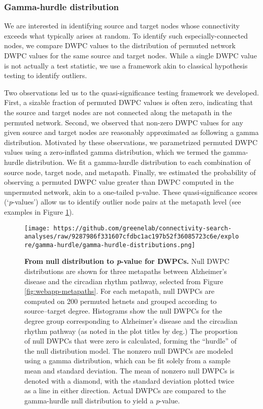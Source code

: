 \hypertarget{gamma-hurdle-distribution}{%
\subsubsection{Gamma-hurdle distribution}\label{gamma-hurdle-distribution}}

We are interested in identifying source and target nodes whose connectivity exceeds what typically arises at random.
To identify such especially-connected nodes, we compare DWPC values to the distribution of permuted network DWPC values for the same source and target nodes.
While a single DWPC value is not actually a test statistic, we use a framework akin to classical hypothesis testing to identify outliers.

Two observations led us to the quasi-significance testing framework we developed.
First, a sizable fraction of permuted DWPC values is often zero, indicating that the source and target nodes are not connected along the metapath in the permuted network.
Second, we observed that non-zero DWPC values for any given source and target nodes are reasonably approximated as following a gamma distribution.
Motivated by these observations, we parametrized permuted DWPC values using a zero-inflated gamma distribution, which we termed the gamma-hurdle distribution.
We fit a gamma-hurdle distribution to each combination of source node, target node, and metapath.
Finally, we estimated the probability of observing a permuted DWPC value greater than DWPC computed in the unpermuted network, akin to a one-tailed p-value.
These quasi-significance scores (`\emph{p}-values') allow us to identify outlier node pairs at the metapath level (see examples in Figure \ref{fig:null-dwpc-distributions}).

\begin{figure}
\hypertarget{fig:null-dwpc-distributions}{%
\centering
\texttt{[image: https://github.com/greenelab/connectivity-search-analyses/raw/9287986f331607cfdbc1ac197b52f36085723c6e/explore/gamma-hurdle/gamma-hurdle-distributions.png]}
\caption{\textbf{From null distribution to \emph{p}-value for DWPCs.}
Null DWPC distributions are shown for three metapaths between Alzheimer's disease and the circadian rhythm pathway, selected from Figure \ref{fig:webapp-metapaths}.
For each metapath, null DWPCs are computed on 200 permuted hetnets and grouped according to source--target degree.
Histograms show the null DWPCs for the degree group corresponding to Alzheimer's disease and the circadian rhythm pathway (as noted in the plot titles by deg.)
The proportion of null DWPCs that were zero is calculated, forming the ``hurdle'' of the null distribution model.
The nonzero null DWPCs are modeled using a gamma distribution, which can be fit solely from a sample mean and standard deviation.
The mean of nonzero null DWPCs is denoted with a diamond, with the standard deviation plotted twice as a line in either direction.
Actual DWPCs are compared to the gamma-hurdle null distribution to yield a \emph{p}-value.}\label{fig:null-dwpc-distributions}
}
\end{figure}

